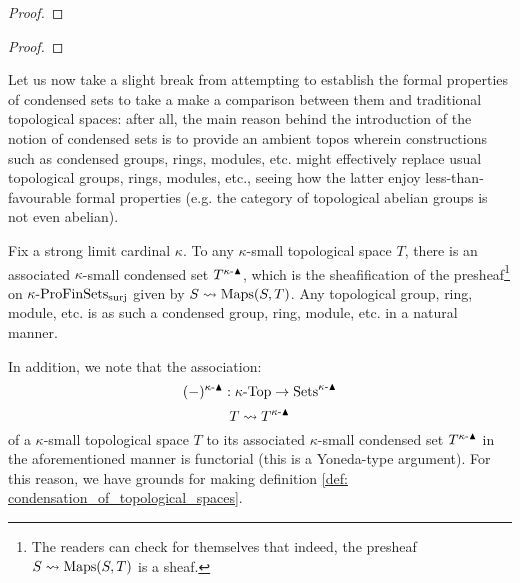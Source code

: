                 \begin{proof}
                    
                \end{proof}
            \begin{proposition} \label{prop: increasing_the_cardinal_bound_on_condensed_sets}
                
            \end{proposition}
                \begin{proof}
                    
                \end{proof}
                
            Let us now take a slight break from attempting to establish the formal properties of condensed sets to take a make a comparison between them and traditional topological spaces: after all, the main reason behind the introduction of the notion of condensed sets is to provide an ambient topos wherein constructions such as condensed groups, rings, modules, etc. might effectively replace usual topological groups, rings, modules, etc., seeing how the latter enjoy less-than-favourable formal properties (e.g. the category of topological abelian groups is not even abelian).
            \begin{remark} \label{remark: topological_spaces_and_condensed_sets}
                Fix a strong limit cardinal $\kappa$. To any $\kappa$-small topological space $T$, there is an associated $\kappa$-small condensed set $T^{\kappa\text{-}\blacktriangle}$, which is the sheafification of the presheaf\footnote{The readers can check for themselves that indeed, the presheaf $S \leadsto \mathrm{Maps}(S, T)$ is a sheaf.} on $\kappa\text{-}\mathrm{Pro}\mathrm{Fin}\mathrm{Sets}_{\mathrm{surj}}$ given by $S \leadsto \mathrm{Maps}(S, T)$. Any topological group, ring, module, etc. is as such a condensed group, ring, module, etc. in a natural manner. 
                
                In addition, we note that the association:
                    $$(-)^{\kappa\text{-}\blacktriangle}: \kappa\text{-}\mathrm{Top} \to \mathrm{Sets}^{\kappa\text{-}\blacktriangle}$$
                    $$T \leadsto T^{\kappa\text{-}\blacktriangle}$$
                of a $\kappa$-small topological space $T$ to its associated $\kappa$-small condensed set $T^{\kappa\text{-}\blacktriangle}$ in the aforementioned manner is functorial (this is a Yoneda-type argument). For this reason, we have grounds for making definition \ref{def: condensation_of_topological_spaces}. 
            \end{remark}

